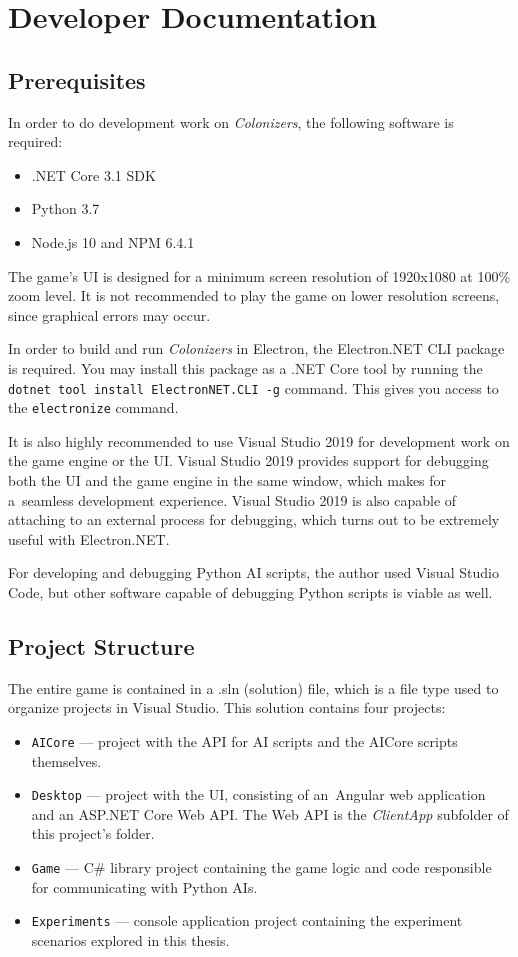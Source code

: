 \section{Developer Documentation}
\label{sec:devdocs} 

\subsection{Prerequisites}

In order to do development work on \emph{Colonizers}, the following software
is required:
\begin{itemize}
    \item .NET Core 3.1 SDK
    \item Python 3.7
    \item Node.js 10 and NPM 6.4.1
\end{itemize}
The game's UI is designed for a minimum screen resolution of 1920x1080 at
100\% zoom level. It is not recommended to play the game on lower resolution
screens, since graphical errors may occur.

In order to build and run \emph{Colonizers} in Electron, the Electron.NET CLI
package is required. You may install this package as a .NET Core tool by running
the \texttt{dotnet tool install ElectronNET.CLI -g} command. This gives you
access to the \texttt{electronize} command.

It is also highly recommended to use Visual Studio 2019 for development work
on the game engine or the UI. Visual Studio 2019 provides support for debugging
both the UI and the game engine in the same window, which makes for a~seamless
development experience. Visual Studio 2019 is also capable of attaching
to an external process for debugging, which turns out to be
extremely useful with Electron.NET.

For developing and debugging Python AI scripts, the author used Visual Studio Code,
but other software capable of debugging Python scripts is viable as well.

\subsection{Project Structure}

The entire game is contained in a .sln (solution) file, which is a file type used
to organize projects in Visual Studio. This solution contains four projects:
\begin{itemize}
    \item \texttt{AICore} --- project with the API for AI scripts and the AICore
        scripts themselves.
    \item \texttt{Desktop} --- project with the UI, consisting of an~Angular
        web application and an ASP.NET Core Web API. The Web API is the
        \emph{ClientApp} subfolder of this project's folder.
    \item \texttt{Game} --- C\# library project containing the game logic
        and code responsible for communicating with Python AIs.
    \item \texttt{Experiments} --- console application project containing
        the experiment scenarios explored in this thesis.
\end{itemize}

